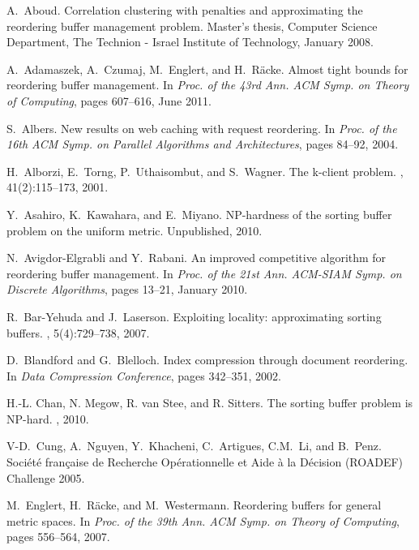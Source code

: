 \documentclass[11pt]{article}
\begin{document}
\begin{thebibliography}{10}

A.~Aboud.
\newblock Correlation clustering with penalties and approximating the
  reordering buffer management problem.
\newblock Master's thesis, Computer Science Department, The {Technion} -
  {Israel} Institute of Technology, January 2008.

A.~Adamaszek, A.~Czumaj, M.~Englert, and H.~R\"acke.
\newblock Almost tight bounds for reordering buffer management.
\newblock In {\em Proc. of the 43rd Ann. ACM Symp. on Theory of Computing},
  pages 607--616, June 2011.

S.~Albers.
\newblock New results on web caching with request reordering.
\newblock In {\em Proc. of the 16th ACM Symp. on Parallel Algorithms and
  Architectures}, pages 84--92, 2004.

H.~Alborzi, E.~Torng, P.~Uthaisombut, and S.~Wagner.
\newblock The k-client problem.
, 41(2):115--173, 2001.

Y.~Asahiro, K.~Kawahara, and E.~Miyano.
\newblock NP-hardness of the sorting buffer problem on the uniform metric.
\newblock Unpublished, 2010.

N.~Avigdor-Elgrabli and Y.~Rabani.
\newblock An improved competitive algorithm for reordering buffer management.
\newblock In {\em Proc. of the 21st Ann. ACM-SIAM Symp. on Discrete Algorithms},
  pages 13--21, January 2010.

R.~Bar-Yehuda and J.~Laserson.
\newblock Exploiting locality: approximating sorting buffers.
, 5(4):729--738, 2007.

D.~Blandford and G.~Blelloch.
\newblock Index compression through document reordering.
\newblock In {\em Data Compression Conference}, pages 342--351, 2002.

H.-L. Chan, N. Megow, R. van Stee, and R. Sitters.
\newblock The sorting buffer problem is NP-hard.
, 2010.

V-D.~Cung, A.~Nguyen, Y.~Khacheni, C.~Artigues, C.M.~Li, and B.~Penz.
\newblock Soci\'{e}t\'{e} fran\c{c}aise de Recherche Op\'{e}rationnelle et Aide \`{a} la D\'{e}cision
(ROADEF) Challenge 2005.

M.~Englert, H.~R\"{a}cke, and M.~Westermann.
\newblock Reordering buffers for general metric spaces.
\newblock In {\em Proc. of the 39th Ann. ACM Symp. on Theory of Computing},
  pages 556--564, 2007.


\end{thebibliography}
\end{document}
